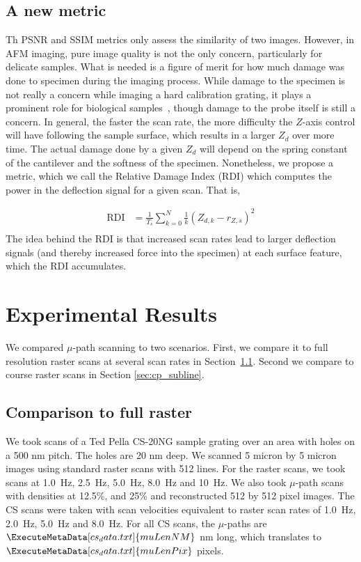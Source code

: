 \documentclass[twocolumn,oneside]{IEEEtran/IEEEtran}
\newcommand{\scanD}[1]{\ExecuteMetaData[cs_data.txt]{#1}}
\begin{document}
\subsection{A new metric}
Th PSNR and SSIM metrics only assess the similarity of two images.
However, in AFM imaging, pure image quality is not the only concern,
particularly for delicate samples. What is needed is a figure of
merit for how much damage was done to specimen during the imaging
process. While damage to the specimen is not really a concern while imaging a hard
calibration grating, it plays a prominent role for biological
samples~\cite{ando_highspeed_2008}, though damage to the probe itself is still a concern.
In general, the faster the scan rate,
the more difficulty the $Z$-axis control
will have following the sample surface,
which results in a larger $Z_d$ over more time. 
The actual damage done by a given $Z_d$ will
depend on the spring constant of the cantilever and the softness of
the specimen. Nonetheless, we propose a metric, which we call the Relative Damage Index (RDI)
which computes the power in the deflection signal for a given scan. That is,

\begin{align}
  \text{RDI} &= \frac{1}{T_s}\sum_{k=0}^N \frac{1}{k} \left(Z_{d,k} - r_{Z,s}\right)^2 \label{eqn:RDI}\\
\end{align}
The idea behind the RDI is that increased scan rates lead to larger
deflection signals (and thereby increased force into the specimen) at
each surface feature, which the RDI accumulates.

\section{Experimental Results}\label{sec:results}
We compared $\mu$-path scanning to two scenarios. First, we compare it
to full resolution raster scans at several scan rates in Section~\ref{sec:cp_full}.
Second we compare to course raster scans in Section \ref{sec:cp_subline}.

\subsection{Comparison to full raster}\label{sec:cp_full}
We took scans of a Ted Pella CS-20NG sample grating over an area with
holes on a 500 nm pitch. The holes are 20 nm deep. We scanned 5 micron
by 5 micron images using standard raster scans with 512 lines. For the
raster scans, we took scans at 1.0~Hz, 2.5~Hz, 5.0~Hz, 8.0~Hz and
10~Hz. We also took $\mu$-path scans with densities at 12.5\%,
and 25\% and reconstructed 512 by 512 pixel images. The CS scans were
taken with scan velocities equivalent to raster scan rates of 1.0~Hz,
2.0~Hz, 5.0~Hz and 8.0~Hz. For all CS scans, the $\mu$-paths are
$\scanD{muLenNM}$ nm long, which translates to $\scanD{muLenPix}$
pixels.
\end{document}

